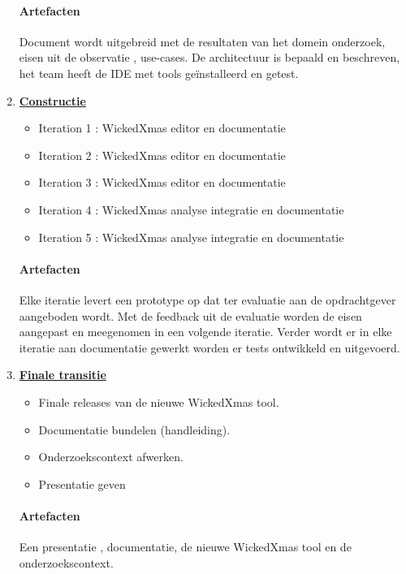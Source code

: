 \begin{enumerate}
	\paragraph{Artefacten}
	Document wordt uitgebreid met de resultaten van het domein onderzoek, eisen uit de observatie , use-cases. De architectuur is bepaald en beschreven, het team heeft de IDE met tools ge\"{i}nstalleerd en getest.   
	
\item \underline{\textbf{Constructie}}
		\begin{itemize}
			\item Iteration 1 : WickedXmas editor en documentatie
			\item Iteration 2 : WickedXmas editor en documentatie
			\item Iteration 3 : WickedXmas editor en documentatie
			\item Iteration 4 : WickedXmas analyse integratie en documentatie
			\item Iteration 5 : WickedXmas analyse integratie en documentatie
		\end{itemize}
		
		\paragraph{Artefacten}
		Elke iteratie levert een prototype op dat ter evaluatie aan de opdrachtgever aangeboden wordt. Met de feedback uit de evaluatie worden de eisen aangepast en meegenomen in een volgende iteratie. Verder wordt er in elke iteratie aan documentatie gewerkt worden er tests ontwikkeld en uitgevoerd.
		
\item \underline{\textbf{Finale transitie}}
	\begin{itemize}
		\item Finale releases van de nieuwe WickedXmas tool.
		\item Documentatie bundelen (handleiding).
		\item Onderzoekscontext afwerken.
		\item Presentatie geven
	\end{itemize}
	\paragraph{Artefacten}
	Een presentatie , documentatie, de nieuwe WickedXmas tool en de onderzoekscontext.

\end{enumerate}








